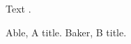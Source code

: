 \documentclass{article}
\begin{document}
Text \cite{a}.

\vspace{0.4cm}
\begin{enumerate}
 Able, A title.
 Baker, B title.
\end{enumerate}
\end{document}

